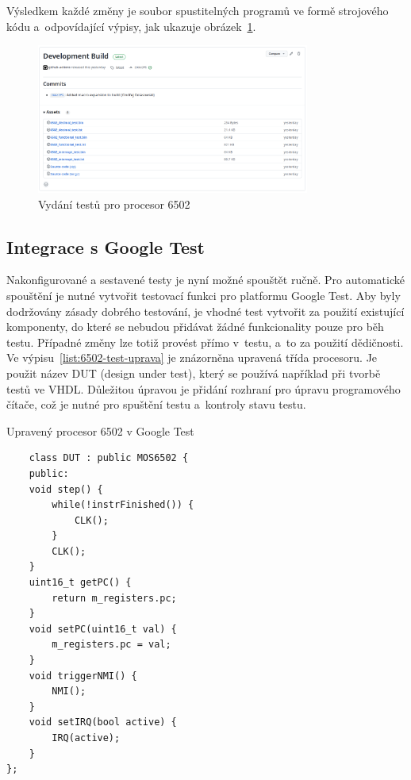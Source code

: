 Výsledkem každé změny je soubor spustitelných programů ve formě strojového kódu a~odpovídající výpisy, jak ukazuje obrázek~\ref{fig:vydani-testu-6502}.

\begin{figure}[ht!]
	\centering
	\caption{Vydání testů pro procesor 6502}
	\label{fig:vydani-testu-6502}
    \includegraphics[width=0.8\textwidth]{images/vydani-testu-6502.png}
\end{figure}

\subsection{Integrace s Google Test}
Nakonfigurované a sestavené testy je nyní možné spouštět ručně. Pro automatické spouštění je nutné vytvořit testovací funkci pro platformu Google Test. Aby byly dodržovány zásady dobrého testování, je vhodné test vytvořit za použití existující komponenty, do které se nebudou přidávat žádné funkcionality pouze pro běh testu. Případné změny lze totiž provést přímo v~testu, a~to za použití dědičnosti. Ve výpisu~\ref{list:6502-test-uprava} je znázorněna upravená třída procesoru. Je použit název DUT (design under test), který se používá například při tvorbě testů ve VHDL. Důležitou úpravou je přidání rozhraní pro úpravu programového čítače, což je nutné pro spuštění testu a~kontroly stavu testu.

\begin{listing}
	\caption{Upravený procesor 6502 v Google Test}
	\label{list:6502-test-uprava}
	\begin{verbatim}
    class DUT : public MOS6502 {
	public:
	void step() {
		while(!instrFinished()) {
			CLK();
		}
		CLK();
	}
	uint16_t getPC() {
		return m_registers.pc;
	}
	void setPC(uint16_t val) {
		m_registers.pc = val;
	}
	void triggerNMI() {
		NMI();
	}
	void setIRQ(bool active) {
		IRQ(active);
	}
};
	\end{verbatim}
\end{listing}

